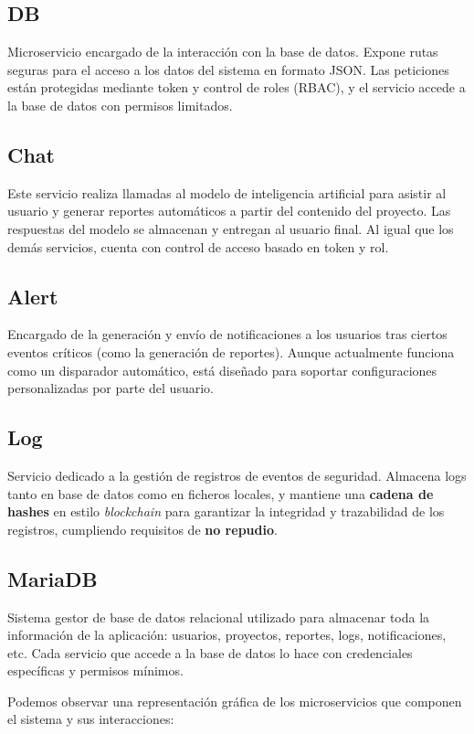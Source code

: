 \documentclass[11pt]{article}
\begin{document}
\subsection*{DB}
Microservicio encargado de la interacción con la base de datos. Expone rutas seguras para el acceso a los datos del sistema en formato JSON. Las peticiones están protegidas mediante token y control de roles (RBAC), y el servicio accede a la base de datos con permisos limitados.

\subsection*{Chat}
Este servicio realiza llamadas al modelo de inteligencia artificial para asistir al usuario y generar reportes automáticos a partir del contenido del proyecto. Las respuestas del modelo se almacenan y entregan al usuario final. Al igual que los demás servicios, cuenta con control de acceso basado en token y rol.

\subsection*{Alert}
Encargado de la generación y envío de notificaciones a los usuarios tras ciertos eventos críticos (como la generación de reportes). Aunque actualmente funciona como un disparador automático, está diseñado para soportar configuraciones personalizadas por parte del usuario.

\subsection*{Log}
Servicio dedicado a la gestión de registros de eventos de seguridad. Almacena logs tanto en base de datos como en ficheros locales, y mantiene una \textbf{cadena de hashes} en estilo \textit{blockchain} para garantizar la integridad y trazabilidad de los registros, cumpliendo requisitos de \textbf{no repudio}.

\subsection*{MariaDB}
Sistema gestor de base de datos relacional utilizado para almacenar toda la información de la aplicación: usuarios, proyectos, reportes, logs, notificaciones, etc. Cada servicio que accede a la base de datos lo hace con credenciales específicas y permisos mínimos.

Podemos observar una representación gráfica de los microservicios que componen el sistema y sus interacciones:
\end{document}
